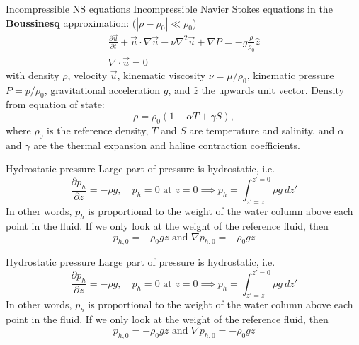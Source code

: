 \documentclass[12pt]{beamer}
\newcommand\pp[2]{\frac{\partial #1}{\partial #2}}
\newcommand\ppt[1]{\pp{#1}t}
\newcommand\grad\nabla
\renewcommand\div{\nabla\cdot}
\renewcommand\emph[1]{{\bf #1}}
\begin{document}
\begin{frame}{Incompressible NS equations}
  Incompressible Navier Stokes equations in the \emph{Boussinesq} approximation:
  ($|\rho-\rho_0|\ll \rho_0$)
  \begin{gather*}
    \ppt{\vec u} + \vec u\cdot\grad\vec u - \nu \nabla^2 \vec u 
    + \grad P = -g \frac\rho{\rho_0} \hat z \\
    \div \vec u =0
  \end{gather*}
  with density $\rho$, velocity $\vec u$, kinematic viscosity $\nu=\mu/\rho_0$, 
  kinematic pressure $P=p/\rho_0$, gravitational acceleration $g$, and $\hat z$ the upwards unit
  vector. Density from equation of state:
  \begin{equation*}
    \rho = \rho_0 \left( 1 - \alpha T + \gamma S\right),
  \end{equation*}
  where $\rho_0$ is the reference density, $T$ and $S$ are temperature and
  salinity, and $\alpha$ and $\gamma$ are the thermal expansion and haline
  contraction coefficients.
\end{frame}

\begin{frame}{Hydrostatic pressure}
  Large part of pressure is hydrostatic, i.e.
  \begin{equation*}
    \pp{p_h}z = -\rho g,\quad p_h=0\text{ at }z=0 \implies
    p_h=\int_{z'=z}^{z'=0} \rho g ~dz'
  \end{equation*}
  In other words, $p_h$ is proportional to the weight of the water column
  above each point in the fluid. If we only look at the weight of the reference
  fluid, then
  \begin{equation*}
    p_{h,0}=-\rho_0 gz \text{ and } \nabla p_{h,0}=-\rho_0 g \hat z
  \end{equation*}

\end{frame}

\begin{frame}{Hydrostatic pressure}
  Large part of pressure is hydrostatic, i.e.
  \begin{equation*}
    \pp{p_h}z = -\rho g,\quad p_h=0\text{ at }z=0 \implies
    p_h=\int_{z'=z}^{z'=0} \rho g ~dz'
  \end{equation*}
  In other words, $p_h$ is proportional to the weight of the water column
  above each point in the fluid. If we only look at the weight of the reference
  fluid, then
  \begin{equation*}
    p_{h,0}=-\rho_0 gz \text{ and } \nabla p_{h,0}=-\rho_0 g \hat z
  \end{equation*}
\end{frame}
\end{document}
